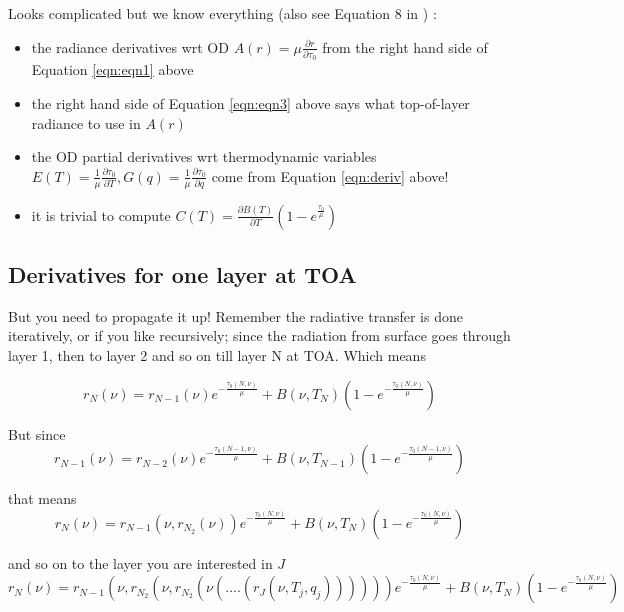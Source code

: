 \documentclass[11pt]{article}
\begin{document}
Looks complicated but we know everything (also see \eg Equation 8 in \citep{liu:06}) : 
\begin{itemize}
\item the radiance derivatives wrt OD $A(r) =  \mu \frac{\partial r}{\partial \tau_0} $ from the right hand side of Equation \ref{eqn:eqn1} above
\item the right hand side of Equation \ref{eqn:eqn3} above says what top-of-layer radiance to use in $A(r)$
\item the OD partial derivatives wrt thermodynamic variables $E(T) =  \frac{1}{\mu} \frac{\partial \tau_0}{\partial T} , G(q) =  \frac{1}{\mu} \frac{\partial \tau_0}{\partial q} $ come from Equation \ref{eqn:deriv} above!
\item it is trivial to compute $C(T) = \frac{\partial B(T)}{\partial T} (1 - e^{\frac{\tau_0}{\mu}})$
\end{itemize}

\subsection{Derivatives for one layer at TOA}

But you need to propagate it up! Remember the radiative transfer is
done iteratively, or if you like recursively; since the radiation from
surface goes through layer 1, then to layer 2 and so on till layer N
at TOA. Which means

\begin{equation}
r_N(\nu) = r_{N-1}(\nu) e^{-\frac{\tau_{0}(N,\nu)}{\mu}} + B(\nu,T_N) (1 - e^{-\frac{\tau_{0}(N,\nu)}{\mu}})
\end{equation}

But since
\begin{equation}
r_{N-1}(\nu) = r_{N-2}(\nu) e^{-\frac{\tau_{0}(N-1,\nu)}{\mu}} + B(\nu,T_{N-1}) (1 - e^{-\frac{\tau_{0}(N-1,\nu)}{\mu}})
\end{equation}

that means 
\begin{equation}
r_N(\nu) = r_{N-1}(\nu,r_{N_2}(\nu)) e^{-\frac{\tau_{0}(N,\nu)}{\mu}} + B(\nu,T_N) (1 - e^{-\frac{\tau_{0}(N,\nu)}{\mu}})
\end{equation}

and so on to the layer you are interested in $J$
\begin{equation}
r_N(\nu) = r_{N-1}(\nu,r_{N_2}(\nu,r_{N_2}(\nu(....(r_{J}(\nu,T_j,q_j)))))) e^{-\frac{\tau_{0}(N,\nu)}{\mu}} + B(\nu,T_N) (1 - e^{-\frac{\tau_{0}(N,\nu)}{\mu}})
\label{eqn:eqnNJ}
\end{equation}
\end{document}

